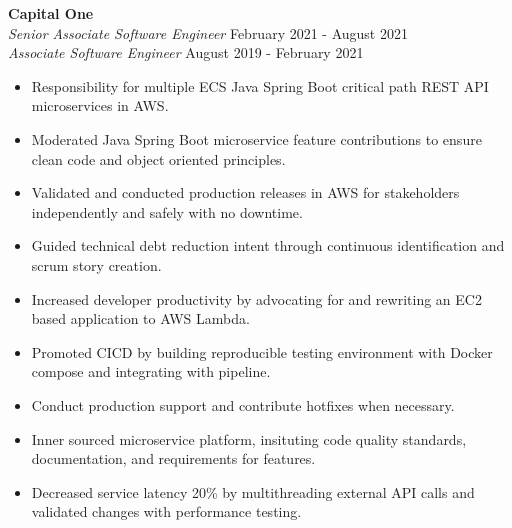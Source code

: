 \documentclass[overlapped]{res}
\begin{document}
\begin{resume}
\textbf{Capital One}  \\
{\sl Senior Associate Software Engineer} \hfill February 2021 - August 2021 \\
{\sl Associate Software Engineer} \hfill August 2019 - February 2021
\begin{itemize}  \itemsep -2pt %
    \item Responsibility for multiple ECS Java Spring Boot critical path REST API microservices in AWS.
    \item Moderated Java Spring Boot microservice feature contributions to ensure clean code and object oriented principles.  %
    \item Validated and conducted production releases in AWS for stakeholders independently and safely with no downtime.
    \item Guided technical debt reduction intent through continuous identification and scrum story creation.
    \item Increased developer productivity by advocating for and rewriting an EC2 based application to AWS Lambda.
    \item Promoted CICD by building reproducible testing environment with Docker compose and integrating with pipeline.
    \item Conduct production support and contribute hotfixes when necessary.
    \item Inner sourced microservice platform, insituting code quality standards, documentation, and requirements for features.
    \item Decreased service latency 20\% by multithreading external
    API calls and validated changes with performance testing.

\end{itemize}
\end{resume}
\end{document}
